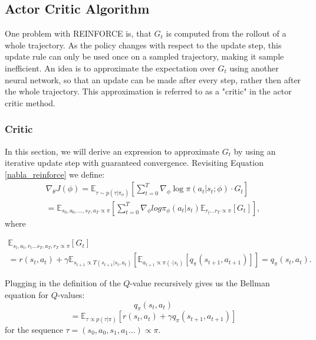 \subsection{Actor Critic Algorithm}
\label{AC-Alg}
One problem with REINFORCE is, that $G_t$ is computed from the rollout of a whole trajectory. As the policy changes with respect to the update step, this update 
rule can only be used once on a sampled trajectory, making it sample inefficient. An idea is to approximate the expectation over $G_t$ using another neural network, so that an update can be made after every step, 
rather then after the whole trajectory. This approximation is referred to as a "critic" in the actor critic method.

\subsubsection{Critic}
In this section, we will derive an expression to approximate $G_t$ by using an iterative update step with guaranteed convergence.
Revisiting Equation \ref{nabla_reinforce} we define: 
\begin{equation}
    \label{ac policy update}
    \begin{aligned}
        \nabla_{\theta} J(\phi) = \mathbb{E}_{\tau \sim p(\tau | \pi_{\phi})} \left[ \sum_{t=0}^T \nabla_{\phi} \log \pi(a_t|s_t;\phi) \cdot  G_t\right]\\
        = \mathbb{E}_{s_0, a_0, ... ,s_T, a_T \propto \pi} \left[
            \sum_{t=0}^{T}\nabla_{\phi} log \pi_{\phi}(a_t|s_t) \mathbb{E}_{r_t...r_T \propto \pi} \left[ G_t \right]
        \right],
    \end{aligned}
\end{equation}
where 

\begin{align}
    \mathbb{E}_{s_t, a_t, r_t...s_T, a_T, r_T \propto \pi} \left[ G_t \right] \\
    = r(s_t,a_t) + \gamma \mathbb{E}_{s_{t+1} \propto T(s_{t+1}|s_t, a_t)}\left[\mathbb{E}_{a_{t+1} \propto \pi(\cdot|s_t)}  \left[q_{\pi}(s_{t+1},a_{t+1})\right]  \right]
    = q_{\pi}(s_{t},a_{t}).
\end{align}


Plugging in the definition of the $Q$-value recursively gives us the Bellman equation for $Q$-values:
\begin{equation*}
q_{\pi}(s_t, a_t) 
\end{equation*}
\begin{equation*}
    = \mathbb{E}_{\tau \propto p(\tau|\pi)} \left[ r(s_t,a_t) + \gamma q_{\pi}(s_{t+1}, a_{t+1})\right]
\end{equation*}
for the sequence $\tau = (s_0,a_0, s_1, a_1...) \propto \pi$.\\

